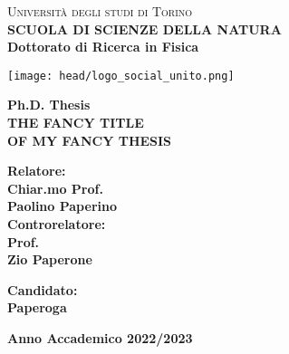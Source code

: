 \begin{titlepage}
\begin{center}
{{\Large{\textsc{Universit\`a degli studi di Torino \\}}}} \vspace{5mm} {\small{\bf SCUOLA DI SCIENZE DELLA NATURA\\ \vspace{3mm}
Dottorato di Ricerca in Fisica}}
\vspace{5mm}
\end{center}
\begin{center}
\texttt{[image: head/logo\_social\_unito.png]}
\end{center}
\begin{center}
\vspace{5mm}
{\large{\bf Ph.D. Thesis\\}}
\vspace{5mm}
{\LARGE{\bf THE FANCY TITLE\\ OF MY FANCY THESIS\\}}
\end{center}
\vspace{20mm}
\par
\noindent
\begin{minipage}[t]{0.47\textwidth}
{\large{\bf Relatore:\\
Chiar.mo Prof.\\
Paolino Paperino}}
\vspace{8mm}
{\large{\bf \\ Controrelatore:\\
Prof.\\
Zio Paperone}}
\end{minipage}
\hfill
\begin{minipage}[t]{0.47\textwidth}\raggedleft
\vspace{20mm}
{\large{\bf Candidato:\\
Paperoga}}
\end{minipage}
\vspace{10mm}
\begin{center}
{\large{\bf 
Anno Accademico 2022/2023}}
\end{center}

\end{titlepage}
